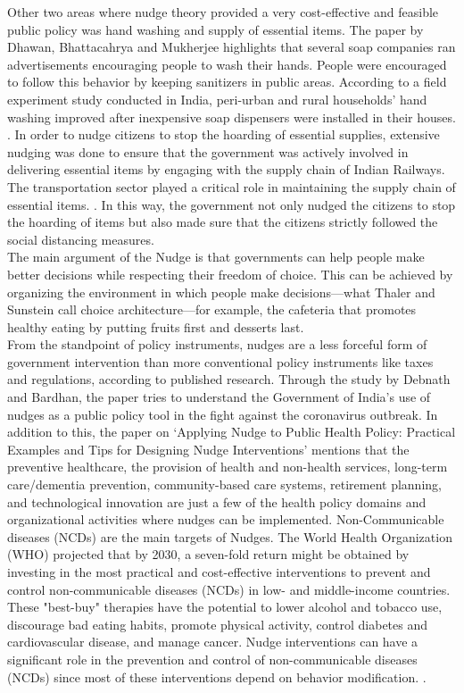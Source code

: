 \documentclass[12pt, a4paper]{article}
\begin{document}
Other two areas where nudge theory provided a very cost-effective and feasible public policy was hand washing and supply of essential items. The paper by Dhawan, Bhattacahrya and Mukherjee \citep{article1} highlights that several soap companies ran advertisements encouraging people to wash their hands. People were encouraged to follow this behavior by keeping sanitizers in public areas. According to a field experiment study conducted in India, peri-urban and rural households' hand washing improved after inexpensive soap dispensers were installed in their houses. \citep{article3}. In order to nudge citizens to stop the hoarding of essential supplies, extensive nudging was done to ensure that the government was actively involved in delivering essential items by engaging with the supply chain of Indian Railways. The transportation sector played a critical role in maintaining the supply chain of essential items. \citep{article1}. In this way, the government not only nudged the citizens to stop the hoarding of items but also made sure that the citizens strictly followed the social distancing measures.\\
The main argument of the Nudge is that governments can help people make better decisions while respecting their freedom of choice. This can be achieved by organizing the environment in which people make decisions—what Thaler and Sunstein \citep{article9} call choice architecture—for example, the cafeteria that promotes healthy eating by putting fruits first and desserts last.\\
From the standpoint of policy instruments, nudges are a less forceful form of government intervention than more conventional policy instruments like taxes and regulations, according to published research. Through the study by Debnath and Bardhan, the paper tries to understand the Government of India's use of nudges as a public policy tool in the fight against the coronavirus outbreak. In addition to this, the paper on ‘Applying Nudge to Public Health Policy: Practical Examples and Tips for Designing Nudge Interventions’ \citep{article4} mentions that the preventive healthcare, the provision of health and non-health services, long-term care/dementia prevention, community-based care systems, retirement planning, and technological innovation are just a few of the health policy domains and organizational activities where nudges can be implemented. Non-Communicable diseases (NCDs) are the main targets of Nudges. The World Health Organization (WHO) projected that by 2030, a seven-fold return might be obtained by investing in the most practical and cost-effective interventions to prevent and control non-communicable diseases (NCDs) in low- and middle-income countries. These "best-buy" therapies have the potential to lower alcohol and tobacco use, discourage bad eating habits, promote physical activity, control diabetes and cardiovascular disease, and manage cancer. Nudge interventions can have a significant role in the prevention and control of non-communicable diseases (NCDs) since most of these interventions depend on behavior modification. \citep{article4}. \\
\end{document}

